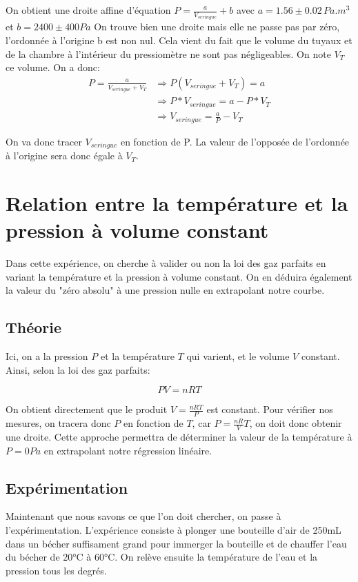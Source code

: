 \documentclass[12pt]{article}
\begin{document}
On obtient une droite affine d'équation $P=\frac{a}{V_{seringue}}+b$ avec $a=1.56\pm 0.02\, Pa.m^3$ et $b=2400\pm 400 Pa$
On trouve bien une droite mais elle ne passe pas par zéro, l'ordonnée à l'origine b est non nul. Cela vient du fait que le volume du tuyaux et de la chambre à l'intérieur du pressiomètre ne sont pas négligeables. On note $V_T$ ce volume. On a donc:
\begin{align*}
P=\frac{a}{V_{seringue}+V_T}&\Rightarrow P(V_{seringue}+V_T)=a \\
	&\Rightarrow P*V_{seringue}=a-P*V_T \\
	&\Rightarrow V_{seringue}=\frac{a}{P}-V_T
\end{align*}

On va donc tracer $V_{seringue}$ en fonction de P. La valeur de l'opposée de l'ordonnée à l'origine sera donc égale à $V_T$. 

\newpage
\section{Relation entre la température et la pression à volume constant}
Dans cette expérience, on cherche à valider ou non la loi des gaz parfaits en variant la température et la pression
à volume constant. On en déduira également la valeur du "zéro absolu" à une pression nulle en extrapolant notre courbe.

\subsection{Théorie}
Ici, on a la pression $P$ et la température $T$ qui varient, et le volume $V$ constant. Ainsi, selon la loi des gaz parfaits:

\begin{equation}
    PV = nRT
\end{equation}

On obtient directement que le produit $V = \frac{nRT}{P}$ est constant. Pour vérifier nos mesures, on tracera donc $P$ en fonction de $T$, 
car $P = \frac{nR}{V} T$, on doit donc obtenir une droite. Cette approche permettra de déterminer la valeur de la température à $P=0Pa$ en extrapolant notre régression linéaire.

\subsection{Expérimentation}
Maintenant que nous savons ce que l'on doit chercher, on passe à l'expérimentation. L'expérience consiste à
plonger une bouteille d'air de 250mL dans un bécher suffisament grand pour immerger la bouteille et de chauffer l'eau du bécher de 20°C à 60°C.
On relève ensuite la température de l'eau et la pression tous les degrés.
\end{document}

